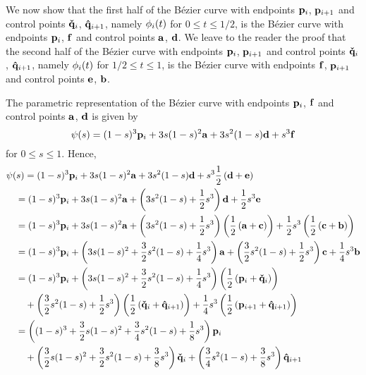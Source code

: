 \begin{rmk}
We now show that the first half of the Bézier curve with endpoints
$\mathbf{p}_i$, $\mathbf{p}_{i+1}$ and control points $\mathbf{\check{q}}_i$,
$\mathbf{\hat{q}}_{i+1}$, namely $\mathbf{\phi}_i(t)$ for
$0\leq t \leq 1/2$, is the Bézier curve with endpoints
$\mathbf{p}_i$, $\mathbf{f}$ and control points $\mathbf{a}$, $\mathbf{d}$.
We leave to the reader the proof that the second half of the Bézier
curve with endpoints $\mathbf{p}_i$, $\mathbf{p}_{i+1}$ and control points
$\mathbf{\check{q}}_i$, $\mathbf{\hat{q}}_{i+1}$, namely $\mathbf{\phi}_i(t)$
for $1/2 \leq t \leq 1$, is the Bézier curve with endpoints
$\mathbf{f}$, $\mathbf{p}_{i+1}$ and control points $\mathbf{e}$, $\mathbf{b}$.

The parametric representation of the Bézier curve with endpoints
$\mathbf{p}_i$, $\mathbf{f}$ and control points $\mathbf{a}$, $\mathbf{d}$ is
given by
\[
\mathbf{\psi}(s) = (1-s)^3 \mathbf{p}_i +3s(1-s)^2 \mathbf{a} +
3s^2(1-s)\mathbf{d} +s^3 \mathbf{f}
\]
for $0 \leq s \leq 1$.  Hence,
\begin{align*}
&\VEC{\psi}(s) =
(1-s)^3 \VEC{p}_i +3s(1-s)^2 \VEC{a} + 3s^2(1-s)\VEC{d} +
s^3 \frac{1}{2}\left(\VEC{d}+\VEC{e}\right) \\
&\quad = (1-s)^3 \VEC{p}_i +3s(1-s)^2 \VEC{a} +
\left( 3s^2(1-s) + \frac{1}{2} s^3\right) \VEC{d}
+ \frac{1}{2} s^3 \VEC{e} \\
&\quad = (1-s)^3 \VEC{p}_i +3s(1-s)^2 \VEC{a} +
\left( 3s^2(1-s) + \frac{1}{2} s^3\right) \left(
\frac{1}{2}\left(\VEC{a}+\VEC{c}\right)\right)
+ \frac{1}{2} s^3 \left( \frac{1}{2}\left(\VEC{c}+\VEC{b}\right)\right) \\
&\quad = (1-s)^3 \VEC{p}_i +
\left(3s(1-s)^2 + \frac{3}{2}s^2(1-s) + \frac{1}{4} s^3\right) \VEC{a}
+ \left( \frac{3}{2}s^2(1-s) + \frac{1}{2} s^3 \right) \VEC{c}
+ \frac{1}{4} s^3 \VEC{b} \\
&\quad = (1-s)^3 \VEC{p}_i +
\left(3s(1-s)^2 + \frac{3}{2} s^2(1-s) + \frac{1}{4} s^3\right)
\left( \frac{1}{2}\left(\VEC{p}_i+\VEC{\check{q}}_i\right) \right) \\
&\qquad + \left( \frac{3}{2} s^2(1-s) + \frac{1}{2} s^3 \right)
\left( \frac{1}{2}\left(\VEC{\check{q}}_i+\VEC{\hat{q}}_{i+1}\right)\right)
+ \frac{1}{4} s^3 \left(
\frac{1}{2}\left(\VEC{p}_{i+1}+\VEC{\hat{q}}_{i+1}\right) \right) \\
&\quad = \left( (1-s)^3 + \frac{3}{2}s(1-s)^2 + \frac{3}{4} s^2(1-s)
+ \frac{1}{8} s^3 \right) \VEC{p}_i \\
&\qquad + \left(\frac{3}{2} s(1-s)^2 +
\frac{3}{2} s^2(1-s) + \frac{3}{8} s^3\right) \VEC{\check{q}}_i
+ \left( \frac{3}{4} s^2(1-s) + \frac{3}{8} s^3 \right) \VEC{\hat{q}}_{i+1}

\end{align*}
\end{rmk}
